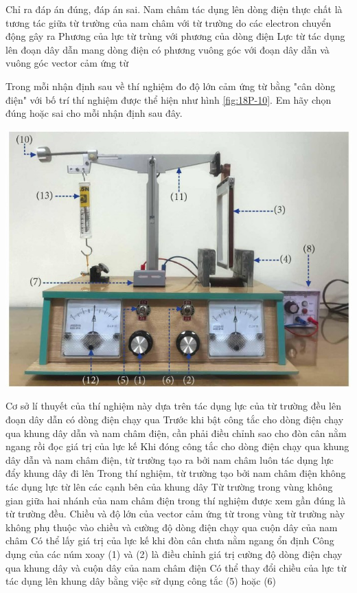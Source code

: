 \begin{ex}
	Chỉ ra đáp án đúng, đáp án sai.
	{Nam châm tác dụng lên dòng điện thực chất là tương tác giữa từ trường của nam châm với từ trường do các electron chuyển động gây ra}
	{Phương của lực từ trùng với phương của dòng điện}
	{\True Lực từ tác dụng lên đoạn dây dẫn mang dòng điện có phương vuông góc với đoạn dây dẫn và vuông góc vector cảm ứng từ}
	\loigiai{}
\end{ex}
\begin{ex}
	Trong mỗi nhận định sau về thí nghiệm đo độ lớn cảm ứng từ bằng "cân dòng điện" với bố trí thí nghiệm được thể hiện như hình \ref{fig:18P-10}. Em hãy chọn đúng hoặc sai cho mỗi nhận định sau đây.
	\begin{center}
		\includegraphics[width=0.55\linewidth]{../figs/VN12-Y24-PH-SYL-018P-10}
		\label{fig:18P-10}
	\end{center}
	\choiceTFt
	{\True Cơ sở lí thuyết của thí nghiệm này dựa trên tác dụng lực của từ trường đều lên đoạn dây dẫn có dòng điện chạy qua}
	{\True Trước khi bật công tắc cho dòng điện chạy qua khung dây dẫn và nam châm điện, cần phải điều chỉnh sao cho đòn cân nằm ngang rồi đọc giá trị của lực kế}
	{Khi đóng công tắc cho dòng điện chạy qua khung dây dẫn và nam châm điện, từ trường tạo ra bởi nam châm luôn tác dụng lực đẩy khung dây đi lên}
	{\True Trong thí nghiệm, từ trường tạo bởi nam châm điện không tác dụng lực từ lên các cạnh bên của khung dây}
	{Từ trường trong vùng không gian giữa hai nhánh của nam châm điện trong thí nghiệm được xem gần đúng là từ trường đều. Chiều và độ lớn của vector cảm ứng từ trong vùng từ trường này không phụ thuộc vào chiều và cường độ dòng điện chạy qua cuộn dây của nam châm}
	{Có thể lấy giá trị của lực kế khi đòn cân chưa nằm ngang ổn định}
	{\True Công dụng của các núm xoay (1) và (2) là điều chỉnh giá trị cường độ dòng điện chạy qua khung dây và cuộn dây của nam châm điện}
	{\True Có thể thay đổi chiều của lực từ tác dụng lên khung dây bằng việc sử dụng công tắc (5) hoặc (6)}
	\loigiai{}
\end{ex}

